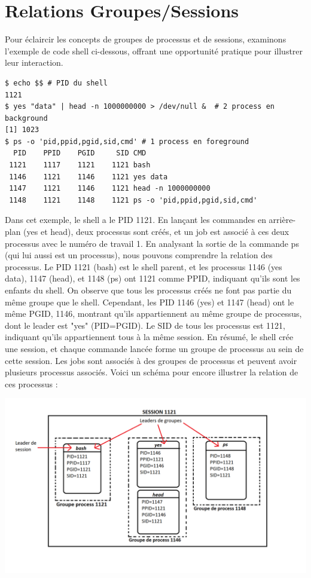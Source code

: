 \section{Relations Groupes/Sessions}

Pour éclaircir les concepts de groupes de processus et de sessions, examinons l'exemple de code shell ci-dessous, offrant une opportunité pratique pour illustrer leur interaction.

\begin{lstlisting}
$ echo $$ # PID du shell
1121
$ yes "data" | head -n 1000000000 > /dev/null &  # 2 process en background
[1] 1023
$ ps -o 'pid,ppid,pgid,sid,cmd' # 1 process en foreground
  PID    PPID    PGID     SID CMD
 1121    1117    1121    1121 bash
 1146    1121    1146    1121 yes data
 1147    1121    1146    1121 head -n 1000000000
 1148    1121    1148    1121 ps -o 'pid,ppid,pgid,sid,cmd'
\end{lstlisting}

Dans cet exemple, le shell a le PID 1121. En lançant les commandes en arrière-plan (yes et head), deux processus sont créés, et un job est associé à ces deux processus avec le numéro de travail 1. 
En analysant la sortie de la commande ps (qui lui aussi est un processus), nous pouvons comprendre la relation des processus.
\newline
Le PID 1121 (bash) est le shell parent, et les processus 1146 (yes data), 1147 (head), et 1148 (ps) ont 1121 comme PPID, indiquant qu'ils sont les enfants du shell. 
On observe que tous les processus créés ne font pas partie du même groupe que le shell. Cependant, les PID 1146 (yes) et 1147 (head) ont le même PGID, 1146, montrant qu'ils appartiennent au 
même groupe de processus, dont le leader est "yes" (PID=PGID). Le SID de tous les processus est 1121, indiquant qu'ils appartiennent tous à la même session.
\newline
En résumé, le shell crée une session, et chaque commande lancée forme un groupe de processus au sein de cette session. Les jobs sont associés à des groupes de processus et peuvent avoir 
plusieurs processus associés.
\newline
\newline
\newline
Voici un schéma pour encore illustrer la relation de ces processus : 

\includegraphics[width=1\textwidth]{img/relationshipSchema.png}